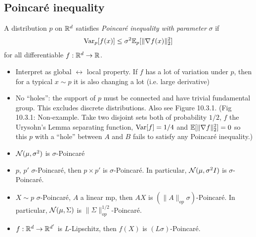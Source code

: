 \subsection{Poincar\'e inequality}%

\begin{definition}
  A distribution $p$ on $\mathbb{R}^d$ satisfies \emph{Poincar\'e inequality with parameter}
  $\sigma$ if
  \begin{align}
    \operatorname{Var}_p[f(x)] \leq \sigma^2 \mathbb{E}_p[\|\nabla f(x)\|_2^2]
  \end{align}
  for all differentiable $f : \mathbb{R}^d \to \mathbb{R}$.
\end{definition}

\begin{remark}
  \begin{itemize}
    \item Interpret as global $\leftrightarrow$ local property. If $f$ has
      a lot of variation under $p$, then for a typical $x \sim p$
      it is also changing a lot (i.e. large derivative)
    \item No ``holes'': the support of $p$ must be connected and have trivial
      fundamental group.
      This excludes discrete distributions. Also see
      Figure 10.3.1.
      (Fig 10.3.1: Non-example. Take two disjoint sets both of
      probability $1/2$, $f$ the Urysohn's Lemma separating function,
      $\operatorname{Var}[f] = 1/4$ and $\mathbb{E}[\|\nabla f\|_2^2] = 0$ so this $p$ with a
      ``hole'' between $A$ and $B$ fails to satisfy any Poincar\'e inequality.)
  \end{itemize}
\end{remark}

\begin{example}
  \begin{itemize}
    \item $\mathcal{N}(\mu, \sigma^2)$ is $\sigma$-Poincar\'e
    \item $p$, $p'$ $\sigma$-Poincar\'e, then $p \times p'$ is
      $\sigma$-Poincar\'e.
      In particular, $\mathcal{N}(\mu, \sigma^2 I)$ is $\sigma$-Poincar\'e.
    \item $X \sim p$ $\sigma$-Poincar\'e, $A$ a linear mp, then
      $A X$ is $(\|A\|_{op} \sigma)$-Poincar\'e.
      In particular, $\mathcal{N}(\mu, \Sigma)$ is $\|\Sigma\|^{1/2}_{op}$-Poincar\'e.
    \item $f : \mathbb{R}^d \to \mathbb{R}^{d'}$ is $L$-Lipschitz, then $f(X)$ is
      $(L \sigma)$-Poincar\'e.
  \end{itemize}
\end{example}

